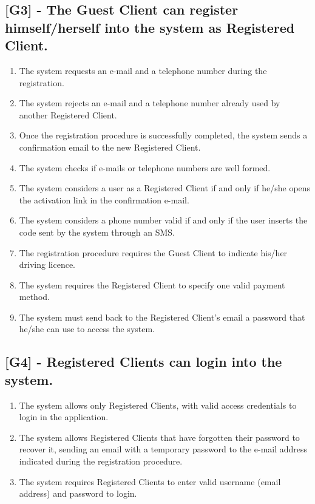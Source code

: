 \subsection{[G3] - The Guest Client can register himself/herself into the system as Registered Client.}
\begin{enumerate}[label=R3.\arabic*]
\item The system requests an e-mail and a telephone number during the registration.
\item The system rejects an e-mail and a telephone number already used by another Registered Client.
\item Once the registration procedure is successfully completed, the system sends a confirmation email to the new Registered Client.
\item The system checks if e-mails or telephone numbers are well formed.
\item The system considers a user as a Registered Client if and only if he/she opens the activation link in the confirmation e-mail.
\item The system considers a phone number valid if and only if the user inserts the code sent by the system through an SMS.
\item The registration procedure requires the Guest Client to indicate his/her driving licence.
\item The system requires the Registered Client to specify one valid payment method.
\item The system must send back to the Registered Client’s email a password that he/she can use to access the system.
\end{enumerate}

\subsection{[G4] - Registered Clients can login into the system.}
\begin{enumerate}[label=R4.\arabic*]
\item The system allows only Registered Clients, with valid access credentials to login in the application.
\item The system allows Registered Clients that have forgotten their password to recover it, sending an email with a temporary password to the e-mail address indicated during the registration procedure.
\item The system requires Registered Clients to enter valid username (email address) and password to login.
\end{enumerate}

